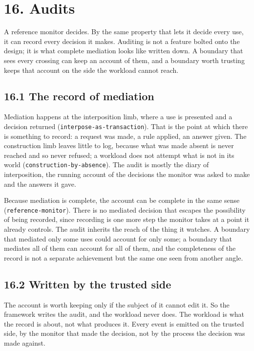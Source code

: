 \hypertarget{audits}{%
\chapter{16. Audits}\label{audits}}

A reference monitor decides. By the same property that lets it decide
every use, it can record every decision it makes. Auditing is not a
feature bolted onto the design; it is what complete mediation looks like
written down. A boundary that sees every crossing can keep an account of
them, and a boundary worth trusting keeps that account on the side the
workload cannot reach.

\hypertarget{the-record-of-mediation}{%
\section{16.1 The record of mediation}\label{the-record-of-mediation}}

Mediation happens at the interposition limb, where a use is presented
and a decision returned (\texttt{interpose-as-transaction}). That is the
point at which there is something to record: a request was made, a rule
applied, an answer given. The construction limb leaves little to log,
because what was made absent is never reached and so never refused; a
workload does not attempt what is not in its world
(\texttt{construction-by-absence}). The audit is mostly the diary of
interposition, the running account of the decisions the monitor was
asked to make and the answers it gave.

Because mediation is complete, the account can be complete in the same
sense (\texttt{reference-monitor}). There is no mediated decision that
escapes the possibility of being recorded, since recording is one more
step the monitor takes at a point it already controls. The audit
inherits the reach of the thing it watches. A boundary that mediated
only some uses could account for only some; a boundary that mediates all
of them can account for all of them, and the completeness of the record
is not a separate achievement but the same one seen from another angle.

\hypertarget{written-by-the-trusted-side}{%
\section{16.2 Written by the trusted
side}\label{written-by-the-trusted-side}}

The account is worth keeping only if the subject of it cannot edit it.
So the framework writes the audit, and the workload never does. The
workload is what the record is about, not what produces it. Every event
is emitted on the trusted side, by the monitor that made the decision,
not by the process the decision was made against.

